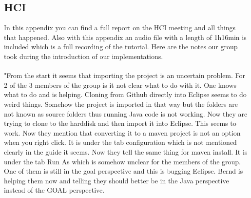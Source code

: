 \documentclass[11pt]{article}
\begin{document}
\begin{appendices}
	\section{HCI}
	In this appendix you can find a full report on the HCI meeting and all things that happened. Also with this appendix an audio file with a length of 1h16min is included which is a full recording of the tutorial. Here are the notes our group took during the introduction of our implementations.\\
	\\
	"From the start it seems that importing the project is an uncertain problem. For 2 of the 3 members of the group is it not clear what to do with it. One knows what to do and is helping. Cloning from Github directly into Eclipse seems to do weird things. Somehow the project is imported in that way but the folders are not known as source folders thus running Java code is not working. Now they are trying to clone to the harddisk and then import it into Eclipse. This seems to work. Now they mention that converting it to a maven project is not an option when you right click. It is under the tab configuration which is not mentioned clearly in the guide it seems. Now they tell the same thing for maven install. It is under the tab Run As which is somehow unclear for the members of the group. One of them is still in the goal perspective and this is bugging Eclipse. Bernd is helping them now and telling they should better be in the Java perspective instead of the GOAL perspective.\par 

\end{appendices}
\end{document}
